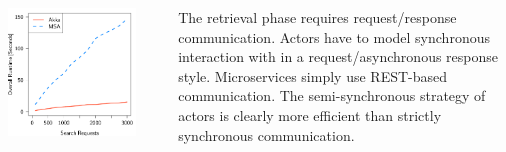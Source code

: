 \documentclass[final,hyperref={pdfpagelabels=true}]{beamer}
\begin{document}
\begin{frame}
\begin{columns}[t]
\begin{column}{.45\textwidth}
      \begin{columns}[t]
        \begin{column}{.4\textwidth}
          \includegraphics[width=1\textwidth]{graphics/eval-search-rtt-overall.pdf}
        \end{column}
        \begin{column}{.05\textwidth}
        \end{column}
        \begin{column}{.55\textwidth}
          {\lmodern

            The retrieval phase requires request/response communication. Actors have to model synchronous interaction with in a request/asynchronous response style. Microservices simply use REST-based communication. The semi-synchronous strategy of actors is clearly more efficient than strictly synchronous communication.  
          }
        \end{column}
      \end{columns}


    \end{column}
  \end{columns}

\end{frame}
\end{document}
